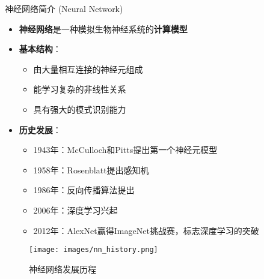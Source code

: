 \documentclass[
  ignorenonframetext,
  aspectratio=169,
  chinese-hans,
]{beamer}
\providecommand{\tightlist}{%
  \setlength{\itemsep}{0pt}\setlength{\parskip}{0pt}}\usepackage{longtable,booktabs,array}
\begin{document}
\begin{frame}{神经网络简介 (Neural Network)}
\label{ux795eux7ecfux7f51ux7edcux7b80ux4ecb-neural-network}
\begin{itemize}
\item
  \textbf{神经网络}是一种模拟生物神经系统的\textbf{计算模型}
\item
  \textbf{基本结构}：

  \begin{itemize}
  \tightlist
  \item
    由大量相互连接的神经元组成
  \item
    能学习复杂的非线性关系
  \item
    具有强大的模式识别能力
  \end{itemize}
\item
  \textbf{历史发展}：

  \begin{itemize}
  \tightlist
  \item
    1943年：McCulloch和Pitts提出第一个神经元模型
  \item
    1958年：Rosenblatt提出感知机
  \item
    1986年：反向传播算法提出
  \item
    2006年：深度学习兴起
  \item
    2012年：AlexNet赢得ImageNet挑战赛，标志深度学习的突破
  \end{itemize}
\end{itemize}

\begin{figure}[H]

{\centering \texttt{[image: images/nn\_history.png]}

}

\caption{神经网络发展历程}

\end{figure}%
\end{frame}
\end{document}
